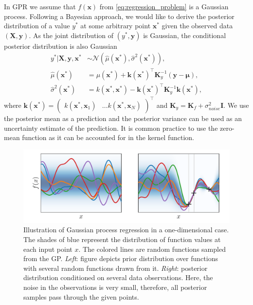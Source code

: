 In GPR we assume that $f(\mathbf{x})$ from \eqref{eq:regression_problem}
is a Gaussian process.
Following a Bayesian approach, we would like to derive the posterior distribution
of a value $y^*$ at some arbitrary point $\mathbf{x}^*$ given the observed data
$(\mathbf{X, y})$.
As the joint distribution of $(y^*, \mathbf{y})$ is Gaussian, the conditional posterior
distribution is also Gaussian
\begin{equation}
\label{eq:gp_posterior}
    \begin{aligned}
        y^* | \mathbf{X}, \mathbf{y}, \mathbf{x}^* &\sim
        \mathcal{N}(\hat{\mu}(\mathbf{x}^*), \hat{\sigma}^2(\mathbf{x}^*)), \\
        \hat{\mu}(\mathbf{x}^*) &=
        \mu(\mathbf{x}^*) + \mathbf{k}(\mathbf{x}^*)^\top \mathbf{K}_y^{-1}
        (\mathbf{y} - \bm{\mu}), \\
        \hat{\sigma}^2(\mathbf{x}^*) &=
        k(\mathbf{x}^*, \mathbf{x}^*) -
        \mathbf{k}(\mathbf{x}^*)^\top \mathbf{K}_y^{-1} \mathbf{k}(\mathbf{x}^*),
    \end{aligned}
\end{equation}
where $\mathbf{k}(\mathbf{x}^*) = \begin{pmatrix}
k(\mathbf{x}^*, \mathbf{x}_1) & \ldots k(\mathbf{x}^*, \mathbf{x}_N)
\end{pmatrix}^\top$
and
$\mathbf{K}_y = \mathbf{K}_f + \sigma_{noise}^2 \mathbf{I}$.
We use the posterior mean as a prediction and the posterior variance
can be used as an uncertainty estimate of the prediction.
It is common practice to use the zero-mean function as it can be accounted for in the kernel function.
\begin{figure}[h]
  \centering
  \includegraphics[width=\textwidth]{figures/intro/gp_intro.pdf}
  \caption{Illustration of Gaussian process regression in a one-dimensional case.
  The shades of blue represent the distribution of function values at each input point $x$.
  The colored lines are random functions sampled from the GP.
  {\em Left}: figure depicts prior distribution over functions with several random
  functions drawn from it.
  {\em Right}: posterior distribution conditioned on several data observations.
  Here, the noise in the observations is very small, therefore, all posterior samples
  pass through the given points.
  }
  \label{fig:gp_intro}
\end{figure}

